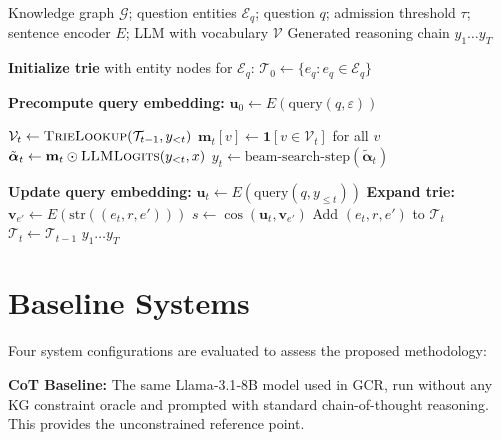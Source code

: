 \begin{algorithm}[H]
  \caption{DCA‑Trie v2: Step‑Wise Semantic Expansion}
  \label{alg:v2}
  \small
  \begin{algorithmic}[1]
    \Require Knowledge graph $\mathcal{G}$; question entities $\mathcal{E}_q$;
    question $q$; admission threshold $\tau$; sentence encoder $E$;
    LLM with vocabulary $\mathcal{V}$
    \Ensure Generated reasoning chain $y_1 \ldots y_T$

    \State \textbf{Initialize trie} with entity nodes for $\mathcal{E}_q$:
    $\mathcal{T}_0 \gets \{e_q : e_q \in \mathcal{E}_q\}$

    \State \textbf{Precompute query embedding:}
    $\mathbf{u}_0 \gets E(\text{query}(q, \varepsilon))$

    \State $\mathcal{V}_t \gets \textsc{TrieLookup}(\mathcal{T}_{t-1}, y_{<t})$
    \State $\mathbf{m}_t[v] \gets \mathbf{1}[v \in \mathcal{V}_t]$ for all $v$
    \State $\tilde{\boldsymbol{\alpha}}_t \gets \mathbf{m}_t \odot
      \textsc{LLMLogits}(y_{<t}, x)$
    \State $y_t \gets \text{beam-search-step}(\tilde{\boldsymbol{\alpha}}_t)$

    \State \textbf{Update query embedding:}
    $\mathbf{u}_t \gets E(\text{query}(q, y_{\leq t}))$
    \State \textbf{Expand trie:}
    \State $\mathbf{v}_{e'} \gets E(\text{str}((e_t, r, e')))$
    \State $s \gets \cos(\mathbf{u}_t, \mathbf{v}_{e'})$
    \State Add $(e_t, r, e')$ to $\mathcal{T}_t$
    \EndIf
    \EndFor
    \Else
    \State $\mathcal{T}_t \gets \mathcal{T}_{t-1}$
    \EndIf
    \EndFor
    \State \Return $y_1 \ldots y_T$
  \end{algorithmic}
\end{algorithm}
\section{Baseline Systems}
\label{sec:ch3baseline}

Four system configurations are evaluated to assess the proposed methodology:

\textbf{CoT Baseline:} The same Llama‑3.1‑8B model \citep{dubey2024llama3} used in GCR, run without any KG constraint oracle and prompted with standard chain-of-thought reasoning. This provides the unconstrained reference point.

